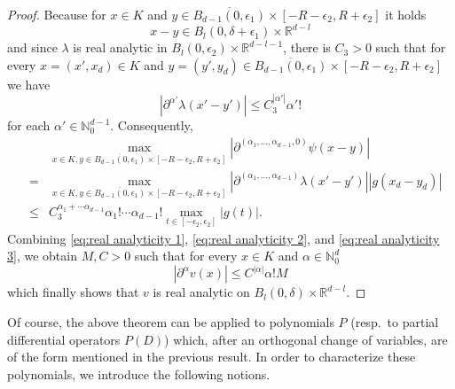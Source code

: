 \documentclass[a4paper,10pt]{amsart}
\newtheorem*{crucial lemma}{Lemma \ref{lem:nice polynomial2}}
\theoremstyle{definition}
\newcommand{\R}{\mathbb{R}}
\newcommand{\N}{\mathbb{N}}
\begin{document}
\begin{proof}
	Because for $x\in K$ and $y\in \overline{B_{d-1}(0,\epsilon_1)}\times[-R-\epsilon_2,R+\epsilon_2]$ it holds
    \[x-y\in B_{l}(0,\delta+\epsilon_1)\times \R^{d-l}\]
	and since $\lambda$ is real analytic in $B_{l}(0,\epsilon_2)\times\R^{d-l-1}$, there is $C_3>0$ such that for every $x=(x',x_d)\in K$ and $y=(y',y_d)\in \overline{B_{d-1}(0,\epsilon_1)}\times[-R-\epsilon_2,R+\epsilon_2]$ we have
	$$|\partial^{\alpha'}\lambda(x'-y')|\leq C_3^{|\alpha'|}\alpha'!$$
	for each $\alpha'\in\N_0^{d-1}$. Consequently,
	\begin{eqnarray}\label{eq:real analyticity 3}
		&&\max_{x\in K, y\in \overline{B_{d-1}(0,\epsilon_1)}\times[-R-\epsilon_2,R+\epsilon_2]}\left|\partial^{(\alpha_1,\ldots,\alpha_{d-1},0)}\psi(x-y)\right|\nonumber\\
		&=&\max_{x\in K, y\in \overline{B_{d-1}(0,\epsilon_1)}\times[-R-\epsilon_2,R+\epsilon_2]}\left|\partial^{(\alpha_1,\ldots,\alpha_{d-1})}\lambda(x'-y')\right|\left|g(x_d-y_d)\right|\nonumber\\
		&\leq&C_3^{\alpha_1+\cdots\alpha_{d-1}}\alpha_1!\cdots\alpha_{d-1}!\max_{t\in [-\epsilon_2,\epsilon_2]} \left|g(t)\right|.
	\end{eqnarray}
	Combining \eqref{eq:real analyticity 1}, \eqref{eq:real analyticity 2}, and \eqref{eq:real analyticity 3}, we obtain $M, C>0$ such that for every $x\in K$ and $\alpha\in\N_0^d$
	\[|\partial^\alpha v(x)|\leq C^{|\alpha|}\alpha! M\]
	which finally shows that $v$ is real analytic on $B_{l}(0,\delta)\times\R^{d-l}$. 
\end{proof}

Of course, the above theorem can be applied to polynomials $P$ (resp.~to partial differential operators $P(D)$) which, after an orthogonal change of variables, are of the form mentioned in the previous result. In order to characterize these polynomials, we introduce the following notions.
\end{document}
